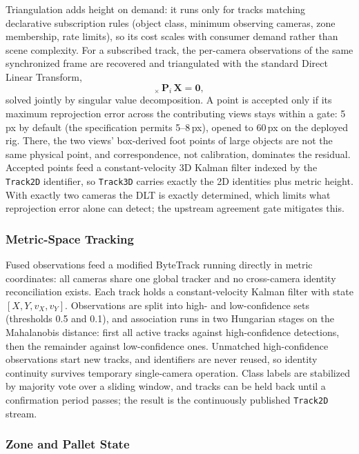 \documentclass[9pt,a4paper,twocolumn]{rho-class/rho}
\begin{document}
Triangulation adds height on demand: it runs only for tracks matching declarative subscription rules (object class, minimum observing cameras, zone membership, rate limits), so its cost scales with consumer demand rather than scene complexity. For a subscribed track, the per-camera observations of the same synchronized frame are recovered and triangulated with the standard Direct Linear Transform,
\begin{equation}
[\mathbf{p}_i]_{\times}\, \mathbf{P}_i\, \mathbf{X} = \mathbf{0},
\end{equation}
solved jointly by singular value decomposition. A point is accepted only if its maximum reprojection error across the contributing views stays within a gate: 5\,px by default (the specification permits 5--8\,px), opened to 60\,px on the deployed rig. There, the two views' box-derived foot points of large objects are not the same physical point, and correspondence, not calibration, dominates the residual. Accepted points feed a constant-velocity 3D Kalman filter indexed by the \texttt{Track2D} identifier, so \texttt{Track3D} carries exactly the 2D identities plus metric height. With exactly two cameras the DLT is exactly determined, which limits what reprojection error alone can detect; the upstream agreement gate mitigates this.

\subsubsection{Metric-Space Tracking}

Fused observations feed a modified ByteTrack running directly in metric coordinates: all cameras share one global tracker and no cross-camera identity reconciliation exists. Each track holds a constant-velocity Kalman filter with state $[X, Y, v_X, v_Y]$. Observations are split into high- and low-confidence sets (thresholds 0.5 and 0.1), and association runs in two Hungarian stages on the Mahalanobis distance: first all active tracks against high-confidence detections, then the remainder against low-confidence ones. Unmatched high-confidence observations start new tracks, and identifiers are never reused, so identity continuity survives temporary single-camera operation. Class labels are stabilized by majority vote over a sliding window, and tracks can be held back until a confirmation period passes; the result is the continuously published \texttt{Track2D} stream.

\subsubsection{Zone and Pallet State}
\end{document}
